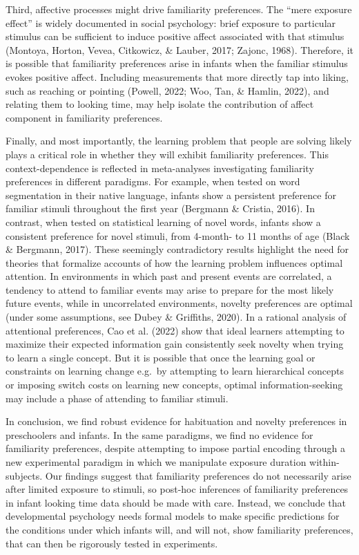 \documentclass[10pt, letterpaper]{article}
\begin{document}
Third, affective processes might drive familiarity preferences. The
``mere exposure effect'' is widely documented in social psychology:
brief exposure to particular stimulus can be sufficient to induce
positive affect associated with that stimulus (Montoya, Horton, Vevea,
Citkowicz, \& Lauber, 2017; Zajonc, 1968). Therefore, it is possible
that familiarity preferences arise in infants when the familiar stimulus
evokes positive affect. Including measurements that more directly tap
into liking, such as reaching or pointing (Powell, 2022; Woo, Tan, \&
Hamlin, 2022), and relating them to looking time, may help isolate the
contribution of affect component in familiarity preferences.

Finally, and most importantly, the learning problem that people are
solving likely plays a critical role in whether they will exhibit
familiarity preferences. This context-dependence is reflected in
meta-analyses investigating familiarity preferences in different
paradigms. For example, when tested on word segmentation in their native
language, infants show a persistent preference for familiar stimuli
throughout the first year (Bergmann \& Cristia, 2016). In contrast, when
tested on statistical learning of novel words, infants show a consistent
preference for novel stimuli, from 4-month- to 11 months of age (Black
\& Bergmann, 2017). These seemingly contradictory results highlight the
need for theories that formalize accounts of how the learning problem
influences optimal attention. In environments in which past and present
events are correlated, a tendency to attend to familiar events may arise
to prepare for the most likely future events, while in uncorrelated
environments, novelty preferences are optimal (under some assumptions,
see Dubey \& Griffiths, 2020). In a rational analysis of attentional
preferences, Cao et al. (2022) show that ideal learners attempting to
maximize their expected information gain consistently seek novelty when
trying to learn a single concept. But it is possible that once the
learning goal or constraints on learning change e.g.~by attempting to
learn hierarchical concepts or imposing switch costs on learning new
concepts, optimal information-seeking may include a phase of attending
to familiar stimuli.

In conclusion, we find robust evidence for habituation and novelty
preferences in preschoolers and infants. In the same paradigms, we find
no evidence for familiarity preferences, despite attempting to impose
partial encoding through a new experimental paradigm in which we
manipulate exposure duration within-subjects. Our findings suggest that
familiarity preferences do not necessarily arise after limited exposure
to stimuli, so post-hoc inferences of familiarity preferences in infant
looking time data should be made with care. Instead, we conclude that
developmental psychology needs formal models to make specific
predictions for the conditions under which infants will, and will not,
show familiarity preferences, that can then be rigorously tested in
experiments.
\end{document}
